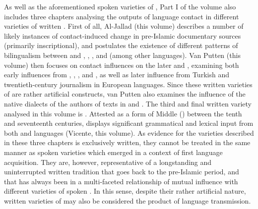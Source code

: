 \documentclass[output=paper]{langsci/langscibook}
\begin{document}
As well as the aforementioned spoken varieties of , Part I of the volume also includes three chapters analysing the outputs of language contact in different varieties of written . First of all, Al-Jallad (this volume) describes a number of likely instances of contact-induced change in pre-Islamic  documentary sources (primarily inscriptional), and postulates the existence of different patterns of {bilingualism} between  and , , , and  (among other languages). Van Putten (this volume) then focuses on contact influences on the later  and , examining both early influences from , , ,  and , as well as later influence from  {Turkish} and twentieth-century journalism in European languages. Since these written varieties of  are rather artificial constructs, van Putten also examines the influence of the native  dialects of the authors of texts in   and . The third and final written  variety analysed in this volume is  . Attested as a form of Middle  (\citealt{Lentin2011Middle}) between the tenth and seventeenth centuries,   displays significant grammatical and lexical input from both  and  languages (Vicente, this volume). As evidence for the  varieties described in these three chapters is exclusively written, they cannot be treated in the same manner as spoken varieties which emerged in a context of first language acquisition. They are, however, representative of a longstanding and uninterrupted written tradition that goes back to the pre-Islamic period, and that has always been in a multi-faceted relationship of mutual influence with different varieties of spoken . In this sense, despite their rather artificial nature, written varieties of  may also be considered the product of language {transmission}.
\end{document}
